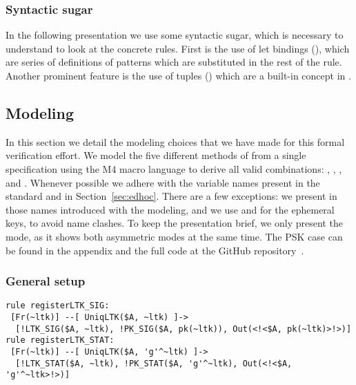 \spacehack
\subsubsection{Syntactic sugar} In the following presentation we use some syntactic
sugar, which is necessary to understand to look at the concrete rules. First is
the use of let bindings (), which are series of
definitions of patterns which are substituted in the rest of the rule. Another
prominent feature is the use of tuples () which are a
built-in concept in \mTamarin.

\spacehack
\subsection{Modeling \mEdhoc{}}
\fillhack
In this section we detail the modeling choices that we have made for this formal
verification effort.
%
We model the five different methods of \mEdhoc{} from a single specification
using the M4 macro language to derive all valid combinations: \mPskPsk,
\mSigSig, \mSigStat, \mStatSig{} and \mStatStat.
%
Whenever possible we adhere with the variable names present in the standard and
in Section~\ref{sec:edhoc}. There are a few exceptions: we present in
 those names introduced with the modeling, and we use  and
 for the ephemeral keys, to avoid name clashes.
%
%
To keep the presentation brief, we only present the \mStatSig{} mode, as it
shows both asymmetric modes at the same time. The PSK case can be found in the
appendix and the full code at the GitHub repository~\cite{edhocTamarinRepo}.
\spacehack
\subsubsection{General setup}
\begin{lstlisting}
rule registerLTK_SIG:
 [Fr(~ltk)] --[ UniqLTK($A, ~ltk) ]->
  [!LTK_SIG($A, ~ltk), !PK_SIG($A, pk(~ltk)), Out(<!<$A, pk(~ltk)>!>)]
rule registerLTK_STAT:
 [Fr(~ltk)] --[ UniqLTK($A, 'g'^~ltk) ]->
  [!LTK_STAT($A, ~ltk), !PK_STAT($A, 'g'^~ltk), Out(<!<$A, 'g'^~ltk>!>)]
\end{lstlisting}

